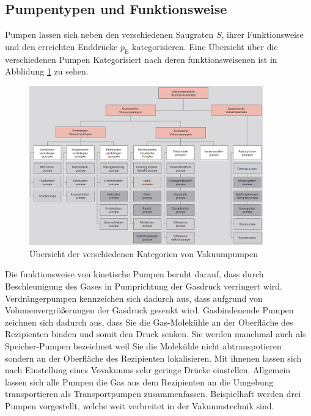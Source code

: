 \subsection{Pumpentypen und Funktionsweise}
Pumpen lassen sich neben den verschiedenen Saugraten $S$, ihrer Funktionsweise und den erreichten Enddrücke $p_\text{E}$ kategorisieren. Eine Übersicht über die verschiedenen Pumpen Kategorisiert nach deren funktionsweisenen ist in Abblidung \ref{fig:Uebersicht} zu sehen.
\begin{figure}[htbp]
  \centering
  \includegraphics[width=0.9\textwidth]{picture/Uebersicht.png}
  \caption{Übersicht der verschiedenen Kategorien von Vakuumpumpen \cite{Uebersicht}}
  \label{fig:Uebersicht}
\end{figure}
Die funktionsweise von kinetische Pumpen beruht darauf, dass durch Beschleunigung des Gases in Pumprichtung der Gasdruck verringert wird.
Verdrängerpumpen kennzeichen sich dadurch aus, dass aufgrund von Volumenvergrößerungen der Gasdruck gesenkt wird.
Gasbindenende Pumpen zeichnen sich dadurch aus, dass Sie die Gas-Molekühle an der Oberfläche des Rezipienten binden und somit den Druck senken. Sie werden manchmal auch als Speicher-Pumpen bezeichnet weil Sie die Molekühle nicht abtranspotieren sondern an der Oberfläche des Rezipienten lokalisieren. Mit ihnenen lassen sich nach Einstellung eines Vovakuums sehr geringe Drücke einstellen.
Allgemein lassen sich alle Pumpen die Gas aus dem Rezipienten an die Umgebung transportieren als Transportpumpen zusammenfassen.
Beispielhaft werden drei Pumpen vorgestellt, welche weit verbreitet in der Vakuumstechnik sind.
